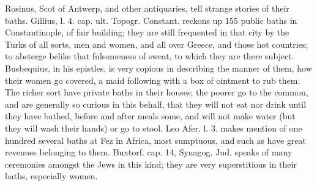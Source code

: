 {Rosinus, Scot of Antwerp, and other antiquaries, tell strange stories
of their baths. Gillius, l. 4. cap. ult. Topogr. Constant. reckons up
155 public baths in Constantinople, of fair building; they are
still frequented in that city by the Turks of all sorts, men and
women, and all over Greece, and those hot countries; to absterge belike
that fulsomeness of sweat, to which they are there subject.
Busbequius, in his epistles, is very copious in describing the
manner of them, how their women go covered, a maid following with a box
of ointment to rub them. The richer sort have private baths in their
houses; the poorer go to the common, and are generally so curious in
this behalf, that they will not eat nor drink until they have bathed,
before and after meals some, and will not make water (but they
will wash their hands) or go to stool. Leo Afer. l. 3. makes mention of
one hundred several baths at Fez in Africa, most sumptuous, and such as
have great revenues belonging to them. Buxtorf. cap. 14, Synagog. Jud.
speaks of many ceremonies amongst the Jews in this kind; they are very
superstitious in their baths, especially women.

}
